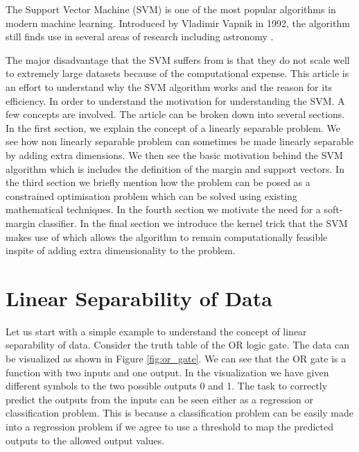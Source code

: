 \documentclass{../template/texnote}
\title{\textbf{\capitalisewords{Understanding the Support Vector Machine Algorithm}}}%
\begin{document}
    \maketitle {}
\nocite{marsland_machine_2014}
The Support Vector Machine (SVM) %
is one of the most popular algorithms in modern machine learning. Introduced by Vladimir Vapnik in 1992, the algorithm still finds use in several areas of research including astronomy \nocite{bobra_solar_2015}. 

The major disadvantage that the SVM suffers from is that they do not scale well to extremely large datasets because of the computational expense. 
This article is an effort to understand why the SVM algorithm works and the reason for its efficiency. 
In order to understand the motivation for understanding the SVM. A few concepts are involved.
The article can be broken down into several sections. In the first section, we explain the concept of a linearly separable problem. We see how non linearly separable problem can sometimes be made linearly separable by adding extra dimensions. We then see the basic motivation behind the SVM algorithm which is includes the definition of the margin and support vectors. In the third section we briefly mention how the problem can be posed as a constrained optimisation problem which can be solved using existing mathematical techniques. In the fourth section we motivate the need for a soft-margin classifier. In the final section we introduce the kernel trick that the SVM makes use of which allows the algorithm to remain computationally feasible inspite of adding extra dimensionality to the problem.

\section{Linear Separability of Data}

Let us start with a simple example to understand the concept of linear separability of data. Consider the truth table of the OR logic gate. The data can be visualized as shown in Figure \ref{fig:or_gate}.
We can see that the OR gate is a function with two inputs and one output. In the visualization we have given different symbols to the two possible outputs 0 and 1. The task to correctly predict the outputs from the inputs can be seen either as a regression or classification problem. This is because a classification problem can be easily made into a regression problem if we agree to use a threshold to map the predicted outputs to the allowed output values. 
\end{document}
